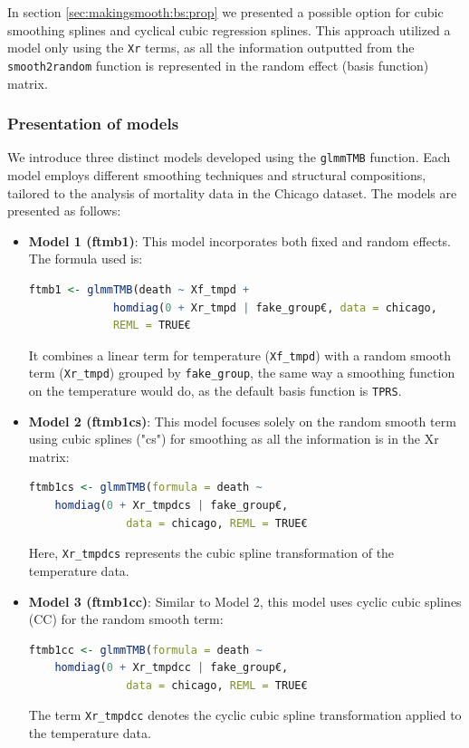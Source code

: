 \documentclass[12pt, twoside,hidelinks]{article}
\theoremstyle{definition}
\numberwithin{equation}{section}
\begin{document}
In section \ref{sec:makingsmooth:bs:prop} we presented a possible option for cubic smoothing splines and cyclical cubic regression splines. 
This approach utilized a model only using the \texttt{Xr} terms, as all the information outputted from the \texttt{smooth2random} function is represented in the random effect (basis function) matrix.
\newline


\subsubsection{Presentation of models}\label{sec:research:optimizing:presentation}

We introduce three distinct models developed using the \texttt{glmmTMB} function. Each model employs different smoothing techniques and structural compositions, tailored to the analysis of mortality data in the Chicago dataset. The models are presented as follows:

\begin{itemize}
    \item \textbf{Model 1 (ftmb1)}: This model incorporates both fixed and random effects. The formula used is: 
    \begin{lstlisting}[language=R]
    ftmb1 <- glmmTMB(death ~ Xf_tmpd +
             homdiag(0 + Xr_tmpd | fake_group€, data = chicago,
             REML = TRUE€
    \end{lstlisting}
    It combines a linear term for temperature (\texttt{Xf\_tmpd}) with a random smooth term (\texttt{Xr\_tmpd}) grouped by \texttt{fake\_group}, the same way a smoothing function on the temperature would do, as the default basis function is \texttt{TPRS}.

    \item \textbf{Model 2 (ftmb1cs)}: This model focuses solely on the random smooth term using cubic splines ("cs") for smoothing as all the information is in the Xr matrix:
    \begin{lstlisting}[language=R]
    ftmb1cs <- glmmTMB(formula = death ~ 
    homdiag(0 + Xr_tmpdcs | fake_group€, 
               data = chicago, REML = TRUE€
    \end{lstlisting}
    Here, \texttt{Xr\_tmpdcs} represents the cubic spline transformation of the temperature data.

    \item \textbf{Model 3 (ftmb1cc)}: Similar to Model 2, this model uses cyclic cubic splines (CC) for the random smooth term:
    \begin{lstlisting}[language=R]
    ftmb1cc <- glmmTMB(formula = death ~ 
    homdiag(0 + Xr_tmpdcc | fake_group€,
               data = chicago, REML = TRUE€
    \end{lstlisting}
    The term \texttt{Xr\_tmpdcc} denotes the cyclic cubic spline transformation applied to the temperature data.
\end{itemize}
\end{document}
